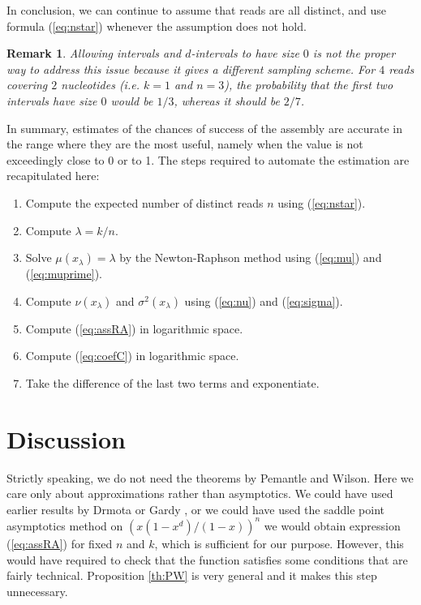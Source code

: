 \documentclass{article}
\newtheorem*{remark}{Remark}
\begin{document}
In conclusion, we can continue to assume that reads are all distinct, and
use formula (\ref{eq:nstar}) whenever the assumption does not hold.

\begin{remark}
Allowing intervals and $d$-intervals to have size $0$ is not the proper
way to address this issue because it gives a different sampling scheme.
For $4$ reads covering $2$ nucleotides (\textit{i.e.} $k=1$ and $n=3$),
the probability that the first two intervals have size $0$ would be $1/3$,
whereas it should be $2/7$.
\end{remark}

In summary, estimates of the chances of success of the assembly are
accurate in the range where they are the most useful, namely when the
value is not exceedingly close to 0 or to 1. The steps required to
automate the estimation are recapitulated here:

\begin{enumerate}
\item Compute the expected number of distinct reads $n$ using
(\ref{eq:nstar}). 
\item Compute $\lambda = k/n$.
\item Solve $\mu(x_\lambda) = \lambda$ by the Newton-Raphson method using
(\ref{eq:mu}) and (\ref{eq:muprime}).
\item Compute $\nu(x_\lambda)$ and $\sigma^2(x_\lambda)$ using
(\ref{eq:nu}) and (\ref{eq:sigma}).
\item Compute (\ref{eq:assRA}) in logarithmic space.
\item Compute (\ref{eq:coefC}) in logarithmic space.
\item Take the difference of the last two terms and exponentiate.
\end{enumerate}



\section{Discussion}

Strictly speaking, we do not need the theorems by Pemantle and Wilson.
Here we care only about approximations rather than asymptotics. We could
have used earlier results by Drmota \cite{Drmota1994} or Gardy
\cite{Gardy1995}, or we could have used the saddle point asymptotics
method on $(x(1-x^d)/(1-x))^n$ we would obtain expression (\ref{eq:assRA})
for fixed $n$ and $k$, which is sufficient for our purpose. However, this
would have required to check that the function satisfies some conditions
that are fairly technical. Proposition \ref{th:PW} is very general and it
makes this step unnecessary.





\end{document}

